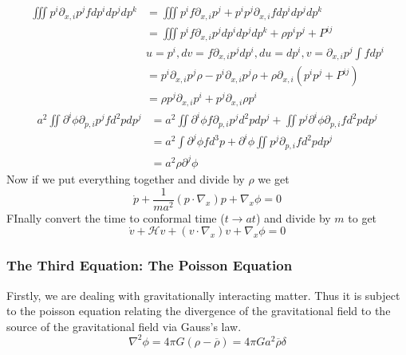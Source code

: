 \begin{equation}
	\begin{split}
		\iiint p^i \partial_{x,i} p^j f dp^i dp^j dp^k &= \iiint p^i f \partial_{x,i} p^j + p^i p^j \partial_{x,i} f dp^i dp^j dp^k \\
													   &= \iiint p^i f \partial_{x,i} p^j dp^i dp^j dp^k + \rho p^i p^j + P^{ij} \\
													   & u = p^i, dv = f \partial_{x,i} p^j dp^i, du = dp^i, v = \partial_{x,i}p^j \int f dp^i \\
													   &= p^i \partial_{x,i} p^j \rho - p^i \partial_{x,i} p^j \rho + \rho\partial_{x,i}( p^i p^j + P^{ij}) \\
													   &= \rho p^j \partial_{x,i} p^i  + p^j\partial_{x,i}\rho p^i
	\end{split}
\end{equation}
\begin{equation}
	\begin{split}
		a^2 \iint \partial^i \phi \partial_{p,i}p^j f d^2p dp^j &= a^2 \iint \partial^i\phi f \partial_{p,i} p^j d^2p dp^j + \iint p^j \partial^i\phi 															\partial_{p,i}f d^2p dp^j \\
																&= a^2 \int \partial^j\phi f d^3p + \partial^i \phi \iint p^j \partial_{p,i}f d^2p dp^j \\
																&= a^2 \rho \partial^j\phi
	\end{split}
\end{equation}
Now if we put everything together and divide by $\rho$ we get
\begin{equation}
	\dot p + \frac{1}{ma^2}(p\cdot\nabla_x) p + \nabla_x\phi = 0
\end{equation}
FInally convert the time to conformal time ($t\rightarrow at$) and divide by $m$ to get
\begin{equation}
	\dot v + \mathcal{H} v + (v\cdot\nabla_x) v + \nabla_x\phi = 0
\end{equation}

\subsubsection{The Third Equation: The Poisson Equation}
Firstly, we are dealing with gravitationally interacting matter. Thus it is subject to the poisson equation relating the divergence of the gravitational field to the source of the gravitational field via Gauss's law.
\begin{equation}
	\nabla^2\phi = 4\pi G (\rho-\overline{\rho}) = 4\pi G a^2 \overline{\rho} \delta
\end{equation}

